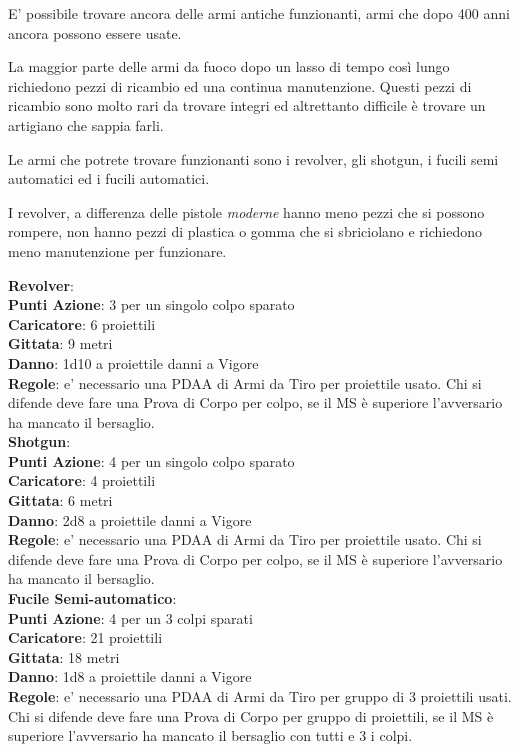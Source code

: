 \documentclass[12pt,a4paper,twoside,openany]{book}
\begin{document}
\begin{multicols}{2}
E' possibile trovare ancora delle armi antiche funzionanti, armi che dopo 400 anni ancora possono essere usate.

La maggior parte delle armi da fuoco dopo un lasso di tempo così lungo richiedono pezzi di ricambio ed una continua manutenzione. Questi pezzi di ricambio sono molto rari da trovare integri ed altrettanto difficile è trovare un artigiano che sappia farli.

Le armi che potrete trovare funzionanti sono i revolver, gli shotgun, i fucili semi automatici ed i fucili automatici.

I revolver, a differenza delle pistole \textit{moderne} hanno meno pezzi che si possono rompere, non hanno pezzi di plastica o gomma che si sbriciolano e richiedono meno manutenzione per funzionare.

\textbf{Revolver}:\\
\textbf{Punti Azione}: 3 per un singolo colpo sparato\\
\textbf{Caricatore}: 6 proiettili\\
\textbf{Gittata}: 9 metri\\
\textbf{Danno}: 1d10 a proiettile danni a Vigore\\
\textbf{Regole}: e' necessario una PDAA di Armi da Tiro per proiettile usato. Chi si difende deve fare una Prova di Corpo per colpo, se il MS è superiore l'avversario ha mancato il bersaglio.\\

\textbf{Shotgun}:\\
\textbf{Punti Azione}: 4 per un singolo colpo sparato\\
\textbf{Caricatore}: 4 proiettili\\
\textbf{Gittata}: 6 metri\\
\textbf{Danno}: 2d8 a proiettile danni a Vigore\\
\textbf{Regole}: e' necessario una PDAA di Armi da Tiro per proiettile usato. Chi si difende deve fare una Prova di Corpo per colpo, se il MS è superiore l'avversario ha mancato il bersaglio.\\

\textbf{Fucile Semi-automatico}:\\
\textbf{Punti Azione}: 4 per un 3 colpi sparati\\
\textbf{Caricatore}: 21 proiettili\\
\textbf{Gittata}: 18 metri\\
\textbf{Danno}: 1d8 a proiettile danni a Vigore\\
\textbf{Regole}: e' necessario una PDAA di Armi da Tiro per gruppo di 3 proiettili usati. Chi si difende deve fare una Prova di Corpo per gruppo di proiettili, se il MS è superiore l'avversario ha mancato il bersaglio con tutti e 3 i colpi.\\



\end{multicols}
\end{document}
